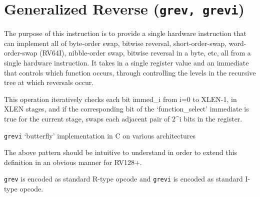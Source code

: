 
\section{Generalized Reverse (\texttt{grev,\ grevi})}

The purpose of this instruction is to provide a single hardware
instruction that can implement all of byte-order swap, bitwise reversal,
short-order-swap, word-order-swap (RV64I), nibble-order swap, bitwise
reversal in a byte, etc, all from a single hardware instruction. It
takes in a single register value and an immediate that controls which
function occurs, through controlling the levels in the recursive tree at
which reversals occur.

This operation iteratively checks each bit immed\_i from i=0 to XLEN-1,
in XLEN stages, and if the corresponding bit of the `function\_select'
immediate is true for the current stage, swaps each adjacent pair of
2\^{}i bits in the register.

\texttt{grevi} `butterfly' implementation in C on various architectures



The above pattern should be intuitive to understand in order to extend
this definition in an obvious manner for RV128+.



\texttt{grev} is encoded as standard R-type opcode and \texttt{grevi} is
encoded as standard I-type opcode.

